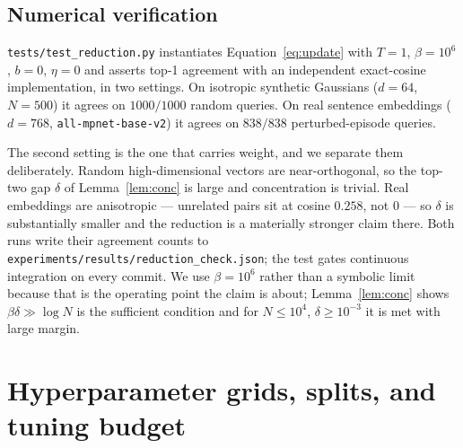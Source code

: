 \subsection{Numerical verification}

\texttt{tests/test\_reduction.py} instantiates Equation~\eqref{eq:update} with
$T{=}1$, $\beta{=}10^6$, $b{=}0$, $\eta{=}0$ and asserts top-1 agreement with an independent
exact-cosine implementation, in two settings. On isotropic synthetic Gaussians ($d{=}64$,
$N{=}500$) it agrees on $1000/1000$ random queries. On real sentence embeddings ($d{=}768$,
\texttt{all-mpnet-base-v2}) it agrees on $838/838$ perturbed-episode queries.

The second setting is the one that carries weight, and we separate them deliberately. Random
high-dimensional vectors are near-orthogonal, so the top-two gap $\delta$ of
Lemma~\ref{lem:conc} is large and concentration is trivial. Real embeddings are anisotropic
--- unrelated pairs sit at cosine $0.258$, not $0$ --- so $\delta$ is substantially smaller
and the reduction is a materially stronger claim there. Both runs write their agreement
counts to \texttt{experiments/results/reduction\_check.json}; the test gates continuous
integration on every commit. We use
$\beta{=}10^6$ rather than a symbolic limit because that is the operating point the claim is
about; Lemma~\ref{lem:conc} shows $\beta\delta \gg \log N$ is the sufficient condition and
for $N \le 10^4$, $\delta \ge 10^{-3}$ it is met with large margin.

\section{Hyperparameter grids, splits, and tuning budget}
\label{app:grids}

